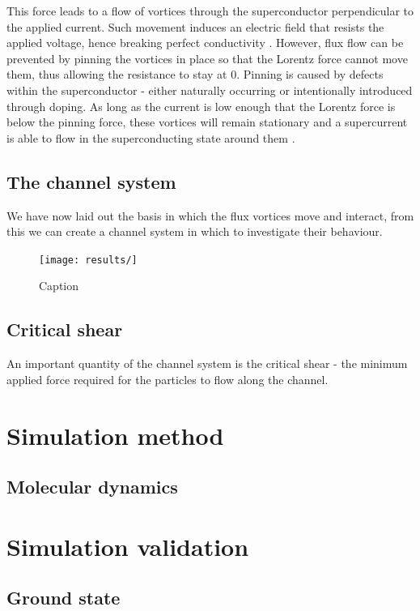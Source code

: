\documentclass{article}
\numberwithin{equation}{section}
\begin{document}
This force leads to a flow of vortices through the superconductor perpendicular to the applied current. Such movement induces an electric field that resists the applied voltage, hence breaking perfect conductivity \cite{Tinkham2004IntroductionSuperconductivity}. However, flux flow can be prevented by pinning the vortices in place so that the Lorentz force cannot move them, thus allowing the resistance to stay at 0. Pinning is caused by defects within the superconductor - either naturally occurring or intentionally introduced through doping. As long as the current is low enough that the Lorentz force is below the pinning force, these vortices will remain stationary and a supercurrent is able to flow in the superconducting state around them \cite{Poole2014Superconductivity}.

\subsection{The channel system}
We have now laid out the basis in which the flux vortices move and interact, from this we can create a channel system in which to investigate their behaviour.

\begin{figure}
    \centering
    \texttt{[image: results/]}
    \caption{Caption}
    \label{fig:my_label}
\end{figure}
 
\subsection{Critical shear}
An important quantity of the channel system is the critical shear - the minimum applied force required for the particles to flow along the channel. 

\section{Simulation method}
\subsection{Molecular dynamics}

\section{Simulation validation}
\subsection{Ground state}
\end{document}
